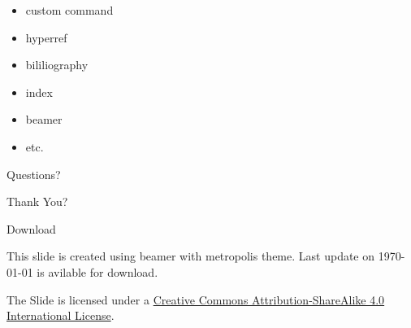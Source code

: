 \documentclass[10pt]{beamer}
\newcommand{\themename}{\textbf{\textsc{metropolis}}\xspace}
\begin{document}
\begin{frame}
\begin{itemize}
	\item custom command
	\item hyperref
	\item bililiography
	\item index
	\item beamer
	\item etc.
\end{itemize}
\end{frame}

{
\begin{frame}[standout]
  Questions?
\end{frame}
}

{
\begin{frame}[standout]
  Thank You?
\end{frame}
}

\appendix

\begin{frame}{Download}

  This slide is created using beamer with metropolis theme. Last update on {\today } is avilable for download.

 \begin{center} 
 \href{https://www.infimath.com/latex-presentation/demo.pdf}{}
 \end{center}

  The Slide is licensed under a
  \href{http://creativecommons.org/licenses/by-sa/4.0/}{Creative Commons
  Attribution-ShareAlike 4.0 International License}.

  \begin{center}\ccbysa\end{center}

\end{frame}






%   
%   
  
  

\end{document}
